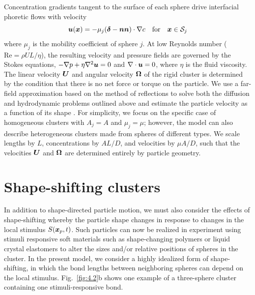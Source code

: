 Concentration gradients tangent to the surface of each sphere drive interfacial phoretic flows with velocity 
\begin{equation}
    \boldsymbol{u}(\boldsymbol{x})=-\mu_j (\boldsymbol{\delta}-\boldsymbol{n}\boldsymbol{n}) \cdot \nabla c\quad \text{for} \quad \boldsymbol{x}\in \mathcal{S}_j
\end{equation}
where  $\mu_j$ is the mobility coefficient of sphere $j$.  At low Reynolds number ($\text{Re}=\rho UL/\eta$), the resulting velocity and pressure fields are governed by the Stokes equations, $-\nabla p + \eta \nabla^2 \boldsymbol{u}=0$ and $\nabla \cdot \boldsymbol{u}=0$, where $\eta$ is the fluid viscosity.  The linear velocity $\boldsymbol{U}$ and angular velocity $\boldsymbol{\Omega}$ of the rigid cluster is determined by the condition that there is no net force or torque on the particle.  We use a far-field approximation based on the method of reflections \autocite{varma2018clustering} to solve both the diffusion and hydrodynamic problems outlined above and estimate the particle velocity as a function of its shape \autocite{Supp}. For simplicity, we focus on the specific case of homogeneous clusters with $A_j=A$ and $\mu_j=\mu$; however, the model can also describe heterogeneous clusters made from spheres of different types.  We scale lengths by $L$, concentrations by $A L/D$, and velocities by $\mu A/D$, such that the velocities $\boldsymbol{U}$ and $\boldsymbol{\Omega}$ are determined entirely by particle geometry.   

\section{Shape-shifting clusters}  
In addition to shape-directed particle motion, we must also consider the effects of shape-shifting whereby the particle shape changes in response to changes in the local stimulus $S(\boldsymbol{x}_p,t)$.  Such particles can now be realized in experiment using stimuli responsive soft materials such as shape-changing polymers \autocite{magdanz2014stimuli} or liquid crystal elastomers \autocite{palagi2016structured} to alter the sizes and/or relative positions of spheres in the cluster.  In the present model, we consider a highly idealized form of shape-shifting, in which the bond lengths between neighboring spheres can depend on the local stimulus.  Fig.\ \ref{fig:4.2}b shows one example of a three-sphere cluster containing one stimuli-responsive bond.

